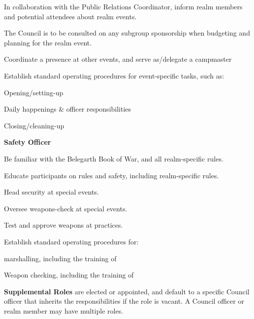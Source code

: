 \documentclass[12pt]{article}
\begin{document}
\begin{level}
\begin{level}
\begin{level}
\begin{level}
            \end{level}
            \item In collaboration with the Public Relations Coordinator, inform realm members and potential attendees about realm events.
            \item The Council is to be consulted on any subgroup sponsorship when budgeting and planning for the realm event.
            \item Coordinate a presence at other events, and serve as/delegate a campmaster
            \item Establish standard operating procedures for event-specific tasks, such as:
            \begin{level}
                \item Opening/setting-up
                \item Daily happenings \& officer responsibilities
                \item Closing/cleaning-up
            \end{level}
        \end{level}
        \item \textbf{Safety Officer}
        \begin{level}
            \item Be familiar with the Belegarth Book of War, and all realm-specific rules.
            \item Educate participants on rules and safety, including realm-specific rules. 
            \item Head security at special events.
            \item Oversee weapons-check at special events.
            \item Test and approve weapons at practices.
            \item Establish standard operating procedures for:
            \begin{level}
                \item marshalling, including the training of
                \item Weapon checking, including the training of
            \end{level}
        \end{level}
\end{level}
\item \textbf{Supplemental Roles} are elected or appointed, and default to a specific Council officer that inherits the responsibilities if the role is vacant. A Council officer or realm member may have multiple roles.

\end{level}
\end{document}
